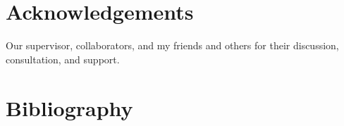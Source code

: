 \documentclass[12pt]{article}
\begin{document}
\pagebreak









\section{Acknowledgements}
Our supervisor, collaborators, and my friends and others for their discussion, consultation, and support.

\pagebreak

\section{Bibliography}
\end{document}
